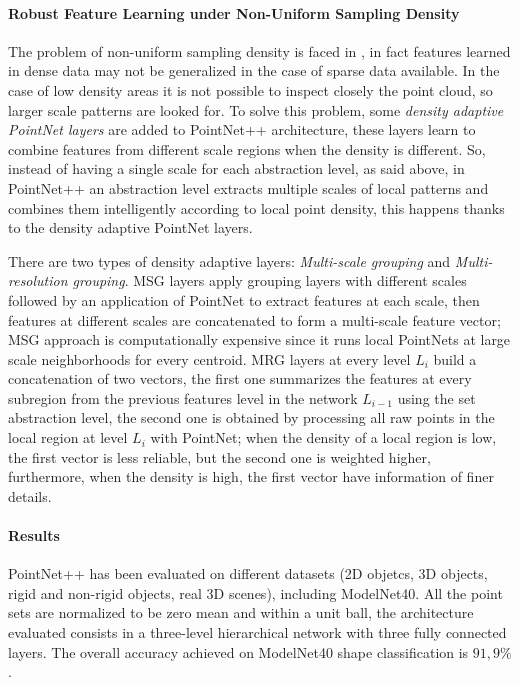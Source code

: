 \paragraph{Robust Feature Learning under Non-Uniform Sampling Density}

The problem of non-uniform sampling density is faced in \cite{qi2017pointnet++}, in fact features learned in dense data may not be generalized in the case of sparse data available. In the case of low density areas it is not possible to inspect closely the point cloud, so larger scale patterns are looked for. To solve this problem, some \textit{density adaptive PointNet layers} are added to PointNet++ architecture, these layers learn to combine features from different scale regions when the density is different. So, instead of having a single scale for each abstraction level, as said above, in PointNet++ an abstraction level extracts multiple scales of local patterns and combines them intelligently according to local point density, this happens thanks to the density adaptive PointNet layers. 

There are two types of density adaptive layers: \textit{Multi-scale grouping} and \textit{Multi-resolution grouping}. MSG layers apply grouping layers with different scales followed by an application of PointNet to extract features at each scale, then features at different scales are concatenated to form a multi-scale feature vector; MSG approach is computationally expensive since it runs local PointNets at large scale neighborhoods for every centroid. MRG layers at every level $L_i$ build a concatenation of two vectors, the first one summarizes the features at every subregion from the previous features level in the network $L_{i-1}$ using the set abstraction level, the second one is obtained by processing all raw points in the local region at level $L_i$ with PointNet; when the density of a local region is low, the first vector is less reliable, but the second one is weighted higher, furthermore, when the density is high, the first vector have information of finer details.

\paragraph{Results}

PointNet++ has been evaluated on different datasets (2D objetcs, 3D objects, rigid and non-rigid objects,  real 3D scenes), including ModelNet40. All the point sets are normalized to be zero mean and within a unit ball, the architecture evaluated consists in a three-level hierarchical network with three fully connected layers. The overall accuracy achieved on ModelNet40 shape classification is $91,9 \%$.

